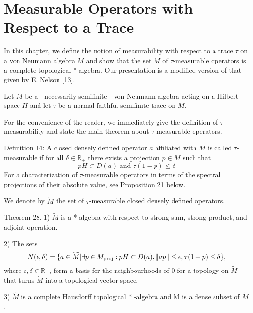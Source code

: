 
% 
\chapter{Measurable Operators with Respect to a Trace}
In this chapter, we define the notion of measurability with respect to a trace $\tau$ on a von Neumann algebra $M$ and show that the set $M$ of $\tau$-measurable operators is a complete topological *-algebra. Our presentation is a modified version of that given by E. Nelson [13].\par
Let $M$ be a - necessarily semifinite - von Neumann algebra acting on a Hilbert space $H$ and let $\tau$ be a normal faithful semifinite trace on $M$.\par
For the convenience of the reader, we immediately give the definition of $\tau$-measurability and state the main theorem about $\tau$-measurable operators.\par

Definition 14: A closed densely defined operator $a$ affiliated with $M$ is called $\tau$-measurable if for all $\delta\in \mathbb{R}_+$ there exists a projection $p\in M$ such that
\[
    pH\subset D(a)\text{ and } \tau(1-p)\leq \delta
\]
For a characterization of $\tau$-measurable operators in terms of the spectral projections of their absolute value, see Proposition 21 below.\par
We denote by $\widetilde{M}$ the set of $\tau$-measurable closed densely defined operators.\par
Theorem 28. 1) $\widetilde{M}$ is a *-algebra with respect to strong sum, strong product, and adjoint operation.\par
2) The sets
\[
    N(\epsilon,\delta)=\{a\in \widetilde{M}|\exists p\in M_{\text{proj}}:pH\subset D(a),\norm{ap}\leq \epsilon,\tau(1-p)\leq \delta\},
\]
where $\epsilon,\delta\in \mathbb{R}_+$, form a basis for the neighbourhoods of $0$ for a topology on $\widetilde{M}$ that turns $\widetilde{M}$ into a topological vector space. \par
3) $\widetilde{M}$ is a complete Hausdorff topological * -algebra and M is a dense subset of $\widetilde{M}$.\par

